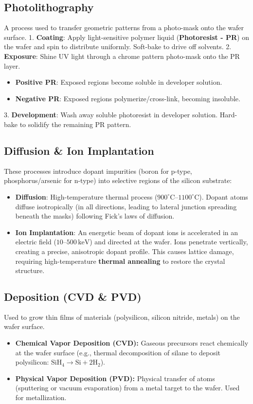 \documentclass[12pt,a4paper]{article}
\begin{document}
\subsection{Photolithography}
A process used to transfer geometric patterns from a photo-mask onto the wafer surface.
1. \textbf{Coating}: Apply light-sensitive polymer liquid (\textbf{Photoresist - PR}) on the wafer and spin to distribute uniformly. Soft-bake to drive off solvents.
2. \textbf{Exposure}: Shine UV light through a chrome pattern photo-mask onto the PR layer.
   \begin{itemize}[leftmargin=*, noitemsep, topsep=2pt]
     \item \textbf{Positive PR}: Exposed regions become soluble in developer solution.
     \item \textbf{Negative PR}: Exposed regions polymerize/cross-link, becoming insoluble.
   \end{itemize}
3. \textbf{Development}: Wash away soluble photoresist in developer solution. Hard-bake to solidify the remaining PR pattern.

\subsection{Diffusion \& Ion Implantation}
These processes introduce dopant impurities (boron for p-type, phosphorus/arsenic for n-type) into selective regions of the silicon substrate:
\begin{itemize}[leftmargin=*, itemsep=3.5pt]
  \item \textbf{Diffusion}: High-temperature thermal process ($900^\circ\text{C}$--$1100^\circ\text{C}$). Dopant atoms diffuse isotropically (in all directions, leading to lateral junction spreading beneath the masks) following Fick's laws of diffusion.
  \item \textbf{Ion Implantation}: An energetic beam of dopant ions is accelerated in an electric field ($10$--$500\,\text{keV}$) and directed at the wafer. Ions penetrate vertically, creating a precise, anisotropic dopant profile. This causes lattice damage, requiring high-temperature \textbf{thermal annealing} to restore the crystal structure.
\end{itemize}

\subsection{Deposition (CVD \& PVD)}
Used to grow thin films of materials (polysilicon, silicon nitride, metals) on the wafer surface.
\begin{itemize}[leftmargin=*, itemsep=3pt]
  \item \textbf{Chemical Vapor Deposition (CVD):} Gaseous precursors react chemically at the wafer surface (e.g., thermal decomposition of silane to deposit polysilicon: $\text{SiH}_4 \to \text{Si} + 2\text{H}_2$).
  \item \textbf{Physical Vapor Deposition (PVD):} Physical transfer of atoms (sputtering or vacuum evaporation) from a metal target to the wafer. Used for metallization.
\end{itemize}
\end{document}
